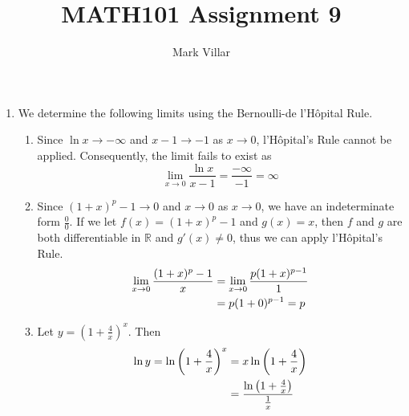 \documentclass[12pt]{amsart}
\title{MATH101 Assignment 9}
\author{Mark Villar}
\begin{document}
 

\maketitle 

\begin{enumerate}
	
	\item We determine the following limits using the Bernoulli-de l'H\^{o}pital Rule.
	
		\begin{enumerate}
		
			\item Since $\ln x \rightarrow -\infty$ and $x-1 \rightarrow -1$ as $x \rightarrow 0$, 
			l'H\^{o}pital's Rule cannot be applied.  Consequently, the limit fails to exist as
			$$\lim_{x \rightarrow 0} \frac{\ln x}{x-1} = \frac{-\infty}{-1} = \infty$$
			
			\item Since $(1+x)^p-1 \rightarrow 0$ and $x \rightarrow 0$ as $x \rightarrow 0$, we have an
			indeterminate form $\frac{0}{0}$. If we let $f(x)=(1+x)^p-1$ and $g(x)=x$, then $f$ and $g$ are 			both differentiable in $\mathbb{R}$ and $g'(x) \ne 0$, thus we can apply l'H\^{o}pital's Rule.
				\begin{align}
					\lim_{x\rightarrow0} \frac{(1+x)^p-1}{x} & = \lim_{x\rightarrow0} \frac{p(1+x)^{p-1}}{1} 					\notag \\
					& = p(1+0)^{p-1} = p \notag
				\end{align}
				
			\item Let $y=\left(1+\frac{4}{x}\right)^x.$ Then
				\begin{align}
					\ln y = \ln \left(1+\frac{4}{x}\right)^x \notag & = x \ln \left(1+\frac{4}{x}\right) \notag \\
					& = \frac{\ln \left(1+\frac{4}{x}\right)}{\frac{1}{x}} \notag
				\end{align}
			

\end{enumerate}
\end{enumerate}
\end{document}
